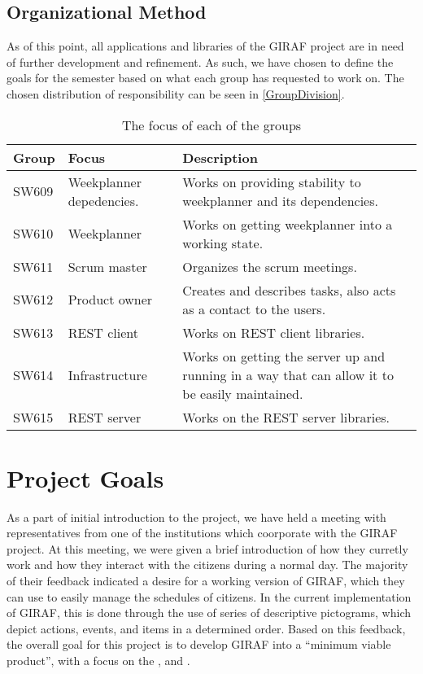 \subsection{Organizational Method}
As of this point, all applications and libraries of the GIRAF project are in
need of further development and refinement. As such, we have chosen to define
the goals for the semester based on what each group has requested to work on.
The chosen distribution of responsibility can be seen in
\autoref{GroupDivision}.

\begin{table}[H]
\centering
\begin{tabular}{|p{2cm}|p{3cm}|p{8cm}|}
\hline
Group & Focus & Description \\ \hline
SW609 & Weekplanner depedencies. & Works on providing stability to
weekplanner and its dependencies.\\\hline 
SW610 & Weekplanner & Works on getting weekplanner into a working
state.\\\hline 
SW611 & Scrum master & Organizes the scrum meetings. \\\hline 
SW612 & Product owner & Creates and describes tasks, also acts as a contact to
the users. \\\hline 
SW613 & REST client & Works on REST client libraries.\\ \hline

SW614 & Infrastructure & Works on getting the server up and running in a way
that can allow it to be easily maintained. \\\hline

SW615 & REST server & Works on the REST server libraries.\\ \hline

\end{tabular}
\caption{The focus of each of the groups}
\label{GroupDivision}
\end{table}

\section{Project Goals}
As a part of initial introduction to the project, we have held a meeting with
representatives from one of the institutions which coorporate with the GIRAF
project. At this meeting, we were given a brief introduction of how they
curretly work and how they interact with the citizens during a normal day. The
majority of their feedback indicated a desire for a working version of GIRAF,
which they can use to easily manage the schedules of citizens. In the
current implementation of GIRAF, this is done through the use of series of
descriptive pictograms, which depict actions, events, and items in a determined
order. Based on this feedback, the overall goal for this project is to develop
GIRAF into a ``minimum viable product'', with a focus on the
,  and .\nl

